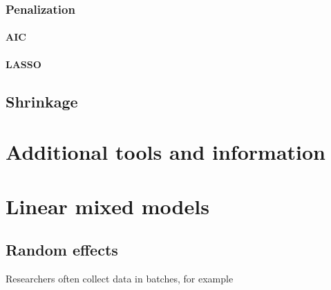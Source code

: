 \documentclass[]{book}
\begin{document}
\hypertarget{penalization}{%
\subsection{Penalization}\label{penalization}}

\hypertarget{aic}{%
\subsubsection{AIC}\label{aic}}

\hypertarget{lasso}{%
\subsubsection{LASSO}\label{lasso}}

\hypertarget{shrinkage}{%
\section{Shrinkage}\label{shrinkage}}

\hypertarget{additional-tools-and-information}{%
\chapter*{Additional tools and information}\label{additional-tools-and-information}}

\hypertarget{linear-mixed-models}{%
\chapter{Linear mixed models}\label{linear-mixed-models}}

\hypertarget{random-effects}{%
\section{Random effects}\label{random-effects}}

Researchers often collect data in batches, for example
\end{document}
